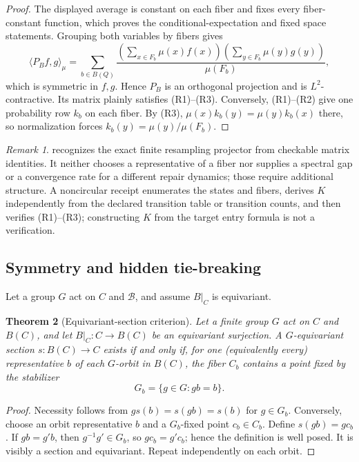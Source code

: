 \documentclass[11pt]{article}
\newtheorem{theorem}{Theorem}[section]
\theoremstyle{definition}
\theoremstyle{remark}
\newtheorem{remark}[theorem]{Remark}
\numberwithin{equation}{section}
\newcommand{\cB}{\mathcal B}
\begin{document}
\begin{proof}
The displayed average is constant on each fiber and fixes every
fiber-constant function, which proves the conditional-expectation and fixed
space statements.  Grouping both variables by fibers gives
\[
 \langle P_Bf,g\rangle_\mu
 =\sum_{b\in B(Q)}
 \frac{(\sum_{x\in F_b}\mu(x)f(x))
       (\sum_{y\in F_b}\mu(y)g(y))}{\mu(F_b)},
\]
which is symmetric in $f,g$.  Hence $P_B$ is an orthogonal projection and is
$L^2$-contractive.  Its matrix plainly satisfies (R1)--(R3).  Conversely,
(R1)--(R2) give one probability row $k_b$ on each fiber.  By (R3),
$\mu(x)k_b(y)=\mu(y)k_b(x)$ there, so normalization forces
$k_b(y)=\mu(y)/\mu(F_b)$.
\end{proof}

\begin{remark}
 recognizes the exact finite
resampling projector from checkable matrix identities.  It neither chooses a
representative of a fiber nor supplies a spectral gap or a convergence rate
for a different repair dynamics; those require additional structure.  A
noncircular receipt enumerates the states and fibers, derives $K$ independently
from the declared transition table or transition counts, and then verifies
(R1)--(R3); constructing $K$ from the target entry formula is not a
verification.
\end{remark}

\subsection{Symmetry and hidden tie-breaking}

Let a group $G$ act on $C$ and $\cB$, and assume $B|_C$ is equivariant.

\begin{theorem}[Equivariant-section criterion]\label{thm:equivariant-section}
Let a finite group $G$ act on $C$ and $B(C)$, and let $B|_C:C\to B(C)$ be an equivariant surjection.  A $G$-equivariant section $s:B(C)\to C$ exists if and only if, for one (equivalently every) representative $b$ of each $G$-orbit in $B(C)$, the fiber $C_b$ contains a point fixed by the stabilizer
\[
 G_b=\{g\in G:gb=b\}.
\]
\end{theorem}

\begin{proof}
Necessity follows from $gs(b)=s(gb)=s(b)$ for $g\in G_b$.  Conversely, choose an orbit representative $b$ and a $G_b$-fixed point $c_b\in C_b$.  Define $s(gb)=gc_b$.  If $gb=g'b$, then $g^{-1}g'\in G_b$, so $gc_b=g'c_b$; hence the definition is well posed.  It is visibly a section and equivariant.  Repeat independently on each orbit.
\end{proof}
\end{document}
